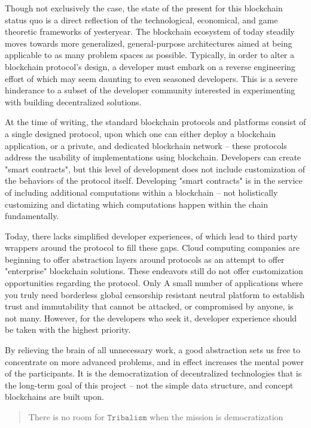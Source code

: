 \documentclass[12pt, titlepage, twocolumn]{report}
\begin{document}
Though not exclusively the case, the state of the present for this blockchain status quo is a direct reflection of the technological, economical, and game theoretic frameworks of yesteryear. The blockchain ecosystem of today steadily moves towards more generalized, general-purpose architectures aimed at being applicable to as many problem spaces as possible. Typically, in order to alter a blockchain protocol's design, a developer must embark on a reverse engineering effort of which may seem daunting to even seasoned developers. This is a severe hinderance to a subset of the developer community interested in experimenting with building decentralized solutions.

At the time of writing, the standard blockchain protocols and platforms consist of a single designed protocol, upon which one can either deploy a blockchain application, or a private, and dedicated blockchain network -- these protocols address the usability of implementations using blockchain. Developers can create "smart contracts", but this level of development does not include customization of the behaviors of the protocol itself. Developing "smart contracts" is in the service of including additional computations within a blockchain -- not holistically customizing and dictating which computations happen within the chain fundamentally. 

Today, there lacks simplified developer experiences, of which lead to third party wrappers around the protocol to fill these gaps. Cloud computing companies are beginning to offer abstraction layers around protocols as an attempt to offer "enterprise" blockchain solutions. These endeavors still do not offer customization opportunities regarding the protocol. Only A small number of applications where you truly need borderless global censorship resistant neutral platform to establish trust and immutability that cannot be attacked, or compromised by anyone, is not many. However, for the developers who seek it, developer experience should be taken with the highest priority.

By relieving the brain of all unnecessary work, a good abstraction sets us free to concentrate on more advanced problems, and in effect increases the mental power of the participants. It is the democratization of decentralized technologies that is the long-term goal of this project -- not the simple data structure, and concept blockchains are built upon.

\begin{quotation}
There is no room for \(\texttt{Tribalism}\) when the mission is democratization
\end{quotation}
\end{document}

